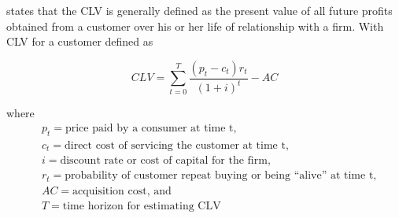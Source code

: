 \cite{gupta} states that the CLV is generally defined as the present value of all future profits obtained from a customer over his or her life of relationship with a firm. With CLV for a customer defined as \citep{gupta}

\[
CLV = \sum_{t=0}^T \frac{(p_t - c_t)r_t}{(1+i)^t} - AC
\]

\noindent where
\begin{align*}
    &p_t = \text{price paid by a consumer at time t,} \\
    &c_t = \text{direct cost of servicing the customer at time t,} \\
    &i = \text{discount rate or cost of capital for the firm,} \\
    &r_t = \text{probability of customer repeat buying or being
“alive” at time t,} \\
    &AC = \text{acquisition cost, and} \\
    &T = \text{time horizon for estimating CLV} \\
\end{align*}
